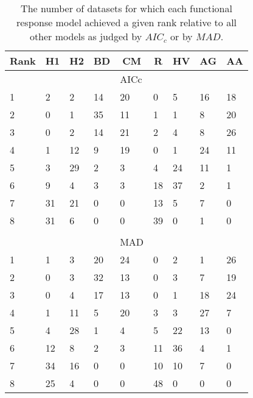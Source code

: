 \begin{table}[!tbp]
\caption{The number of datasets for which each functional response model achieved a given rank relative to all other models as judged by $AIC_c$ or by $MAD$.\label{table:AICc_and_MAD_rankings}} 
\begin{center}
\begin{tabular}{lllllllll}
\hline\hline
\multicolumn{1}{l}{Rank}&\multicolumn{1}{c}{H1}&\multicolumn{1}{c}{H2}&\multicolumn{1}{c}{BD}&\multicolumn{1}{c}{CM}&\multicolumn{1}{c}{R}&\multicolumn{1}{c}{HV}&\multicolumn{1}{c}{AG}&\multicolumn{1}{c}{AA}\tabularnewline
\hline
&&&&AICc&&&&\tabularnewline
1&2&2&14&20&0&5&16&18\tabularnewline
2&0&1&35&11&1&1&8&20\tabularnewline
3&0&2&14&21&2&4&8&26\tabularnewline
4&1&12&9&19&0&1&24&11\tabularnewline
5&3&29&2&3&4&24&11&1\tabularnewline
6&9&4&3&3&18&37&2&1\tabularnewline
7&31&21&0&0&13&5&7&0\tabularnewline
8&31&6&0&0&39&0&1&0\tabularnewline
&&&&&&&&\tabularnewline
&&&&MAD&&&&\tabularnewline
1&1&3&20&24&0&2&1&26\tabularnewline
2&0&3&32&13&0&3&7&19\tabularnewline
3&0&4&17&13&0&1&18&24\tabularnewline
4&1&11&5&20&3&3&27&7\tabularnewline
5&4&28&1&4&5&22&13&0\tabularnewline
6&12&8&2&3&11&36&4&1\tabularnewline
7&34&16&0&0&10&10&7&0\tabularnewline
8&25&4&0&0&48&0&0&0\tabularnewline
\hline
\end{tabular}\end{center}
\end{table}
